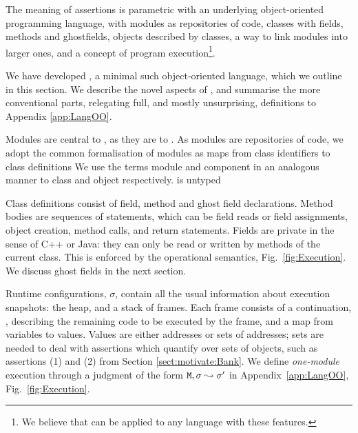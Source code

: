 \renewcommand{\appref}[1]{, c.f. Appendix, Def.\,\ref{#1}}
 
The meaning of \Chainmail assertions is parametric with an
underlying object-oriented programming language, with modules  as repositories of code, classes with fields, methods and
ghostfields, objects described by classes, a way to link  modules into larger ones, and a concept of 
program execution\footnote{We believe that \Chainmail can be applied to 
any language with these features.}.

We have developed   \LangOO, a  minimal such object-oriented language, which we
outline in  this section. 
We  describe the novel aspects of \LangOO, and 
summarise the more conventional parts, relegating  full, and mostly unsurprising,
definitions %
to Appendix \ref{app:LangOO}.
 

Modules are  central to \LangOO, as they are to \Chainmail. As modules are repositories
of code, we adopt the common formalisation of modules as maps from 
class identifiers to class definitions
We use the terms module and component in an
analogous manner to class and object respectively.  \LangOO is untyped 

 Class definitions consist of field, method and ghost field declarations.
Method bodies are sequences of 
statements, which  can be field reads or field assignments, object
creation, method calls, and return statements. 
Fields are private in the sense of C++ or Java: they can only be read or
written by methods of the current class.
This is enforced by the operational semantics, \cf Fig.~\ref{fig:Execution}.
We  discuss ghost fields in the next section.

Runtime configurations, $\sigma$,  contain   all the usual information about execution snapshots: the heap, and a
stack of frames. 
%
Each frame consists of a continuation, , describing the remaining code to be executed by the
frame, and a map from
variables to values. Values are either addresses or sets of addresses; sets 
are needed to deal with assertions which quantify over sets of
objects, such as assertions
(1) and (2) from Section \ref{sect:motivate:Bank}.
% 
We define \emph{one-module} execution  through a judgment of the form ${\mbox{\tt{\ensuremath{{\mbox{\tt{M}}}}}}}, \sigma \leadsto \sigma'$ in Appendix~\ref{app:LangOO}, Fig.~\ref{fig:Execution}. 
%
  

